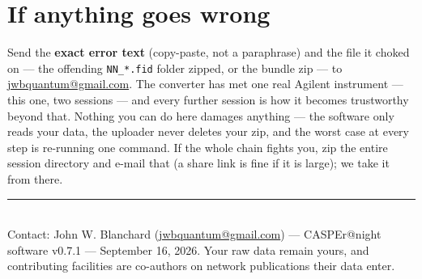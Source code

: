 \documentclass[11pt]{article}
\newcommand{\file}[1]{\texttt{#1}}
\begin{document}
\section{If anything goes wrong}
\label{sec:wrong}

\begin{tcolorbox}[colback=boxbg, colframe=boxframe,
  title=\textbf{One rule: send it, don't fix it}, fonttitle=\bfseries]
Send the \textbf{exact error text} (copy-paste, not a paraphrase) and
the file it choked on --- the offending \file{NN\_*.fid} folder
zipped, or the bundle zip --- to
\href{mailto:jwbquantum@gmail.com}{jwbquantum@gmail.com}.
The converter has met one real Agilent instrument --- this one, two
sessions --- and every further session is how it becomes trustworthy
beyond that. Nothing you can do here damages anything --- the software
only reads your data, the uploader never deletes your zip, and the
worst case at every step is re-running one command. If the whole chain
fights you, zip the entire session directory and e-mail that (a share
link is fine if it is large); we take it from there.
\end{tcolorbox}

\vspace{0.8em}
\noindent\rule{\textwidth}{0.4pt}\\[2pt]
{\small Contact: John W. Blanchard
(\href{mailto:jwbquantum@gmail.com}{jwbquantum@gmail.com}) ---
CASPEr@night software v0.7.1 --- September 16, 2026. Your raw data remain
yours, and contributing facilities are co-authors on network
publications their data enter.}
\end{document}
